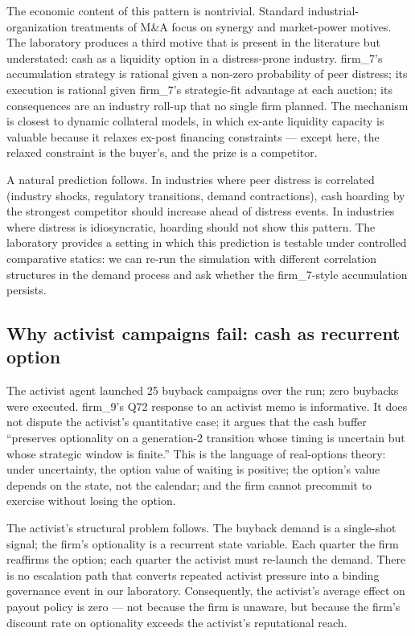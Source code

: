 \documentclass[11pt]{article}
\begin{document}
The economic content of this pattern is nontrivial. Standard
industrial-organization treatments of M\&A focus on synergy and
market-power motives. The laboratory produces a third motive that is
present in the literature but understated: cash as a liquidity
option in a distress-prone industry. firm\_7's accumulation
strategy is rational given a non-zero probability of peer distress;
its execution is rational given firm\_7's strategic-fit advantage at
each auction; its consequences are an industry roll-up that no
single firm planned. The mechanism is closest to
\citet{rampinjviswanathan2010} dynamic collateral models, in which
ex-ante liquidity capacity is valuable because it relaxes ex-post
financing constraints — except here, the relaxed constraint is the
buyer's, and the prize is a competitor.

A natural prediction follows. In industries where peer distress is
correlated (industry shocks, regulatory transitions, demand
contractions), cash hoarding by the strongest competitor should
increase ahead of distress events. In industries where distress is
idiosyncratic, hoarding should not show this pattern. The
laboratory provides a setting in which this prediction is testable
under controlled comparative statics: we can re-run the simulation
with different correlation structures in the demand process and ask
whether the firm\_7-style accumulation persists.

\subsection{Why activist campaigns fail: cash as recurrent option}

The activist agent launched 25 buyback campaigns over the run; zero
buybacks were executed. firm\_9's Q72 response to an activist memo
is informative. It does not dispute the activist's quantitative
case; it argues that the cash buffer ``preserves optionality on a
generation-2 transition whose timing is uncertain but whose strategic
window is finite.'' This is the language of \citet{dixitpindyck1994}
real-options theory: under uncertainty, the option value of waiting
is positive; the option's value depends on the state, not the
calendar; and the firm cannot precommit to exercise without losing
the option.

The activist's structural problem follows. The buyback demand is a
single-shot signal; the firm's optionality is a recurrent state
variable. Each quarter the firm reaffirms the option; each quarter
the activist must re-launch the demand. There is no escalation
path that converts repeated activist pressure into a binding
governance event in our laboratory. Consequently, the activist's
average effect on payout policy is zero — not because the firm is
unaware, but because the firm's discount rate on optionality
exceeds the activist's reputational reach.
\end{document}
